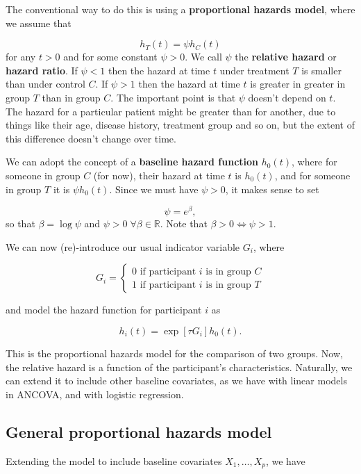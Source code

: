 \documentclass[
  openany]{book}
\theoremstyle{definition}
\theoremstyle{definition}
\theoremstyle{definition}
\theoremstyle{definition}
\theoremstyle{remark}
\begin{document}
The conventional way to do this is using a \textbf{proportional hazards model}, where we assume that

\[h_T\left(t\right) = \psi h_C\left(t\right) \]
for any \(t>0\) and for some constant \(\psi>0\). We call \(\psi\) the \textbf{relative hazard} or \textbf{hazard ratio}. If \(\psi<1\) then the hazard at time \(t\) under treatment \(T\) is smaller than under control \(C\). If \(\psi>1\) then the hazard at time \(t\) is greater in greater in group \(T\) than in group \(C\). The important point is that \(\psi\) doesn't depend on \(t\). The hazard for a particular patient might be greater than for another, due to things like their age, disease history, treatment group and so on, but the extent of this difference doesn't change over time.

We can adopt the concept of a \textbf{baseline hazard function} \(h_0\left(t\right)\), where for someone in group \(C\) (for now), their hazard at time \(t\) is \(h_0\left(t\right)\), and for someone in group \(T\) it is \(\psi h_0\left(t\right)\). Since we must have \(\psi>0\), it makes sense to set

\[\psi = e^{\beta},\]
so that \(\beta = \log\psi\) and \(\psi>0\;\forall\beta\in\mathbb{R}\). Note that \(\beta>0 \iff \psi>1\).

We can now (re)-introduce our usual indicator variable \(G_i\), where

\[ 
G_i = 
\begin{cases}
0\text{  if participant }i\text{ is in group }C\\
1\text{  if participant }i\text{ is in group }T
\end{cases}
\]

and model the hazard function for participant \(i\) as

\[h_i\left(t\right) = \exp\left[\tau G_i\right]h_0\left(t\right).\]

This is the proportional hazards model for the comparison of two groups. Now, the relative hazard is a function of the participant's characteristics. Naturally, we can extend it to include other baseline covariates, as we have with linear models in ANCOVA, and with logistic regression.

\subsection{General proportional hazards model}\label{general-proportional-hazards-model}

Extending the model to include baseline covariates \(X_1,\ldots,X_p\), we have
\end{document}
